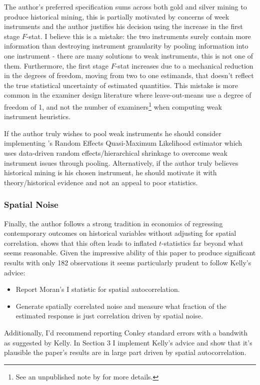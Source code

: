 \documentclass[12pt]{article}
\begin{document}
The author's preferred specification sums across both gold and silver mining to produce historical mining, this is partially motivated by concerns of week instruments and 
the author justifies his decision using the increase in the first stage $F$-stat. I believe this is a mistake: the two instruments surely contain more information than 
destroying instrument granularity  by pooling information into one instrument - there are many solutions to weak instruments, this is not one of them. Furthermore, the first stage $F$-stat increases due to a mechanical reduction in the degrees of freedom, moving from two to one estimands, that doesn't reflect the true statistical uncertainty of estimated quantities. This mistake is more common in the examiner design literature where leave-out-means use a degree of freedom of 1, and not the number of examiners\footnote{See an unpublished note by \cite{hull} for more details.} when computing weak instrument heuristics.


If the author truly wishes to pool weak instruments he should consider implementing \cite{reqml}'s Random Effects Quasi-Maximum Likelihood estimator which uses data-driven random effects/hierarchical shrinkage to overcome weak instrument issues through pooling. Alternatively, if the author truly believes historical mining 
is his chosen instrument, he should motivate it with theory/historical evidence and not an appeal to poor statistics.


\subsubsection*{Spatial Noise}


Finally, the author follows a strong tradition in economics of regressing contemporary outcomes on historical variables without adjusting for spatial correlation. \cite{persistence} shows that this often leads to inflated $t$-statistics far beyond what seems reasonable. Given the impressive ability of this paper to produce significant results 
with only 182 observations it seems particularly prudent to follow Kelly's advice:
\begin{itemize}
    \item Report Moran's I statistic for spatial autocorrelation.
    \item Generate spatially correlated noise and measure what fraction of the estimated response is just correlation driven by spatial noise.
\end{itemize}


Additionally, I'd recommend reporting Conley standard errors with a bandwith as suggested by Kelly. In Section 3 I implement Kelly's advice and show that 
it's plausible the paper's results are in large part driven by spatial autocorrelation.
\end{document}
